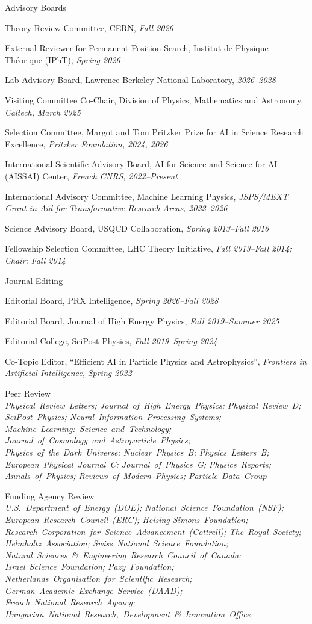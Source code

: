 \el 
\item Advisory Boards
\bsbl 
\item Theory Review Committee, CERN, \emph{Fall 2026}
\item External Reviewer for Permanent Position Search, Institut de Physique Théorique (IPhT), \emph{Spring 2026}
\item Lab Advisory Board, Lawrence Berkeley National Laboratory, \emph{2026--2028}
\item Visiting Committee Co-Chair, Division of Physics, Mathematics and Astronomy, \emph{Caltech, }\emph{March 2025}
\item Selection Committee, Margot and Tom Pritzker Prize for AI in Science Research Excellence, \emph{Pritzker Foundation, }\emph{2024, 2026}
\item International Scientific Advisory Board, AI for Science and Science for AI (AISSAI) Center, \emph{French CNRS, }\emph{2022--Present}
\item International Advisory Committee, Machine Learning Physics, \emph{JSPS/MEXT Grant-in-Aid for Transformative Research Areas, }\emph{2022--2026}
\item Science Advisory Board, USQCD Collaboration, \emph{Spring 2013--Fall 2016}
\item Fellowship Selection Committee, LHC Theory Initiative, \emph{Fall 2013--Fall 2014; Chair: Fall 2014}
\el 
\item Journal Editing
\bsbl 
\item Editorial Board, PRX Intelligence, \emph{Spring 2026--Fall 2028}
\item Editorial Board, Journal of High Energy Physics, \emph{Fall 2019--Summer 2025}
\item Editorial College, SciPost Physics, \emph{Fall 2019--Spring 2024}
\item Co-Topic Editor, ``Efficient AI in Particle Physics and Astrophysics'', \emph{Frontiers in Artificial Intelligence, }\emph{Spring 2022}
\el 
\item \raggedright Peer Review \\ \textit{\nohyphens{Physical~Review~Letters; Journal~of~High~Energy~Physics; Physical~Review~D; SciPost~Physics; Neural~Information~Processing~Systems; Machine~Learning:~Science~and~Technology; Journal~of~Cosmology~and~Astroparticle~Physics; Physics~of~the~Dark~Universe; Nuclear~Physics~B; Physics~Letters~B; European~Physical~Journal~C; Journal~of~Physics~G; Physics~Reports; Annals~of~Physics; Reviews~of~Modern~Physics; Particle~Data~Group}}
\item \raggedright Funding Agency Review \\ \textit{\nohyphens{U.S.~Department~of~Energy~(DOE); National~Science~Foundation~(NSF); European~Research~Council~(ERC); Heising-Simons~Foundation; Research~Corporation~for~Science~Advancement~(Cottrell); The~Royal~Society; Helmholtz~Association; Swiss~National~Science~Foundation; Natural~Sciences~\&~Engineering~Research~Council~of~Canada; Israel~Science~Foundation; Pazy~Foundation; Netherlands~Organisation~for~Scientific~Research; German~Academic~Exchange~Service~(DAAD); French~National~Research~Agency; Hungarian~National~Research,~Development~\&~Innovation~Office}}
